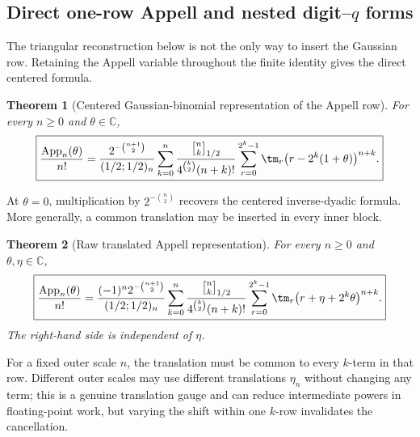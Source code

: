 \documentclass[11pt,oneside]{article}
\newtheorem{theorem}{Theorem}[section]
\theoremstyle{definition}
\theoremstyle{remark}
\newcommand{\C}{\mathbb C}
\newcommand{\qbinom}[3]{\genfrac{[}{]}{0pt}{}{#1}{#2}_{#3}}
\begin{document}
\subsection{Direct one-row Appell and nested digit--$q$ forms}

The triangular reconstruction below is not the only way to insert the Gaussian row.  Retaining
the Appell variable throughout the finite identity gives the direct centered formula.
\begin{theorem}[Centered Gaussian-binomial representation of the Appell row]
\label{dyadicq:thm:centered-q-Appell}
For every $n\ge0$ and $\theta\in\C$,
\begin{equation}
 \boxed{
 \frac{\operatorname{App}_n(\theta)}{n!}
 =\frac{2^{-\binom{n+1}{2}}}{(1/2;1/2)_n}
 \sum_{k=0}^{n}\frac{\qbinom nk{1/2}}{4^{\binom k2}(n+k)!}
 \sum_{r=0}^{2^k-1}\tm_r\bigl(r-2^k(1+\theta)\bigr)^{n+k}.}
 \label{dyadicq:eq:centered-q-Appell}
\end{equation}
\end{theorem}
At $\theta=0$, multiplication by $2^{-\binom n2}$ recovers the centered inverse-dyadic
formula.  More generally, a common translation may be inserted in every inner block.
\begin{theorem}[Raw translated Appell representation]
\label{dyadicq:thm:raw-q-Appell}
For every $n\ge0$ and $\theta,\eta\in\C$,
\begin{equation}
 \boxed{
 \frac{\operatorname{App}_n(\theta)}{n!}
 =\frac{(-1)^n2^{-\binom{n+1}{2}}}{(1/2;1/2)_n}
 \sum_{k=0}^{n}\frac{\qbinom nk{1/2}}{4^{\binom k2}(n+k)!}
 \sum_{r=0}^{2^k-1}\tm_r\bigl(r+\eta+2^k\theta\bigr)^{n+k}.}
 \label{dyadicq:eq:raw-q-Appell}
\end{equation}
The right-hand side is independent of $\eta$.
\end{theorem}

For a fixed outer scale $n$, the translation must be common to every $k$-term in that row.
Different outer scales may use different translations $\eta_n$ without changing any term;
this is a genuine translation gauge and can reduce intermediate powers in floating-point
work, but varying the shift within one $k$-row invalidates the cancellation.
\end{document}
